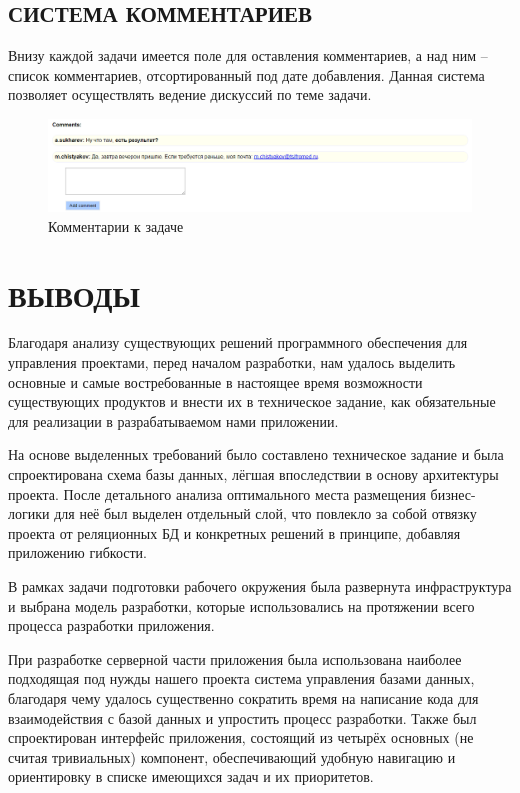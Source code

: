 \documentclass[14pt, a4paper]{extreport}
\begin{document}
\section{\MakeTextUppercase{Система комментариев}}

Внизу каждой задачи имеется поле для оставления комментариев, а над ним -- список комментариев, отсортированный под дате добавления. Данная система позволяет осуществлять ведение дискуссий по теме задачи.

\begin{figure}[!htb]
  \centering
    \includegraphics[scale=0.5]{../shared_images/frontend/comments.png}
   \caption{Комментарии к задаче}
    \label{fig:start}
\end{figure}



\chapter{\MakeTextUppercase{Выводы}}
Благодаря анализу существующих решений программного обеспечения для управления проектами, перед началом разработки, нам удалось выделить основные и самые востребованные в настоящее время возможности существующих продуктов и внести их в техническое задание, как обязательные для реализации в разрабатываемом нами приложении.

На основе выделенных требований было составлено техническое задание и была спроектирована схема базы данных, лёгшая впоследствии в основу архитектуры проекта. После детального анализа оптимального места размещения бизнес-логики для неё был выделен отдельный слой, что повлекло за собой отвязку проекта от реляционных БД и конкретных решений в принципе, добавляя приложению гибкости.

В рамках задачи подготовки рабочего окружения была развернута инфраструктура и выбрана модель разработки, которые использовались на протяжении всего процесса разработки приложения.

При разработке серверной части приложения была использована наиболее подходящая под нужды нашего проекта система управления базами данных, благодаря чему удалось существенно сократить время на написание кода для взаимодействия с базой данных и упростить процесс разработки. Также был спроектирован интерфейс приложения, состоящий из четырёх основных (не считая тривиальных) компонент, обеспечивающий удобную навигацию и ориентировку в списке имеющихся задач и их приоритетов.
\end{document}
